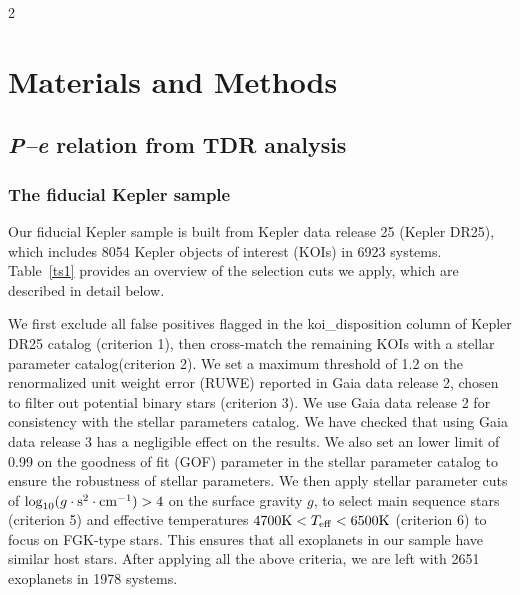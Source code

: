 \documentclass[10pt]{article}
\begin{document}
\begin{multicols}{2}
\section*{Materials and Methods}
\subsection*{\hypertarget{s1}{\emph{P--e} relation from TDR analysis}}
\subsubsection*{\hypertarget{s1.1}{The fiducial Kepler sample}}
\noindent Our fiducial Kepler sample is built from Kepler data release 25 (Kepler DR25)\cite{2018ApJS..235...38T,KDR25}, which includes 8054 Kepler objects of interest (KOIs) in 6923 systems.
Table~\ref{ts1} provides an overview of the selection cuts we apply, which are described in detail below.

We first exclude all false positives flagged in the koi\_disposition column of Kepler DR25 catalog (criterion 1), then cross-match the remaining KOIs with a stellar parameter catalog\cite{2020AJ....159..280B}(criterion 2).
We set a maximum threshold of 1.2 on the renormalized unit weight error (RUWE) reported in Gaia data release 2\cite{2016A&A...595A...1G,2018A&A...616A...1G}, chosen to filter out potential binary stars (criterion 3).
We use Gaia data release 2 for consistency with the stellar parameters catalog\cite{2020AJ....159..280B}.
We have checked that using Gaia data release 3\cite{2023A&A...674A...1G} has a negligible effect on the results.
We also set an lower limit of 0.99 on the goodness of fit (GOF) parameter in the stellar parameter catalog to ensure the robustness of stellar parameters.
We then apply stellar parameter cuts of $\log_{10}(g\cdot{\rm s}^2\cdot{\rm cm}^{-1})>4$ on the surface gravity $g$, to select main sequence stars (criterion 5) and effective temperatures $4700{\rm K} < T_{\rm eff} < 6500{\rm K}$ (criterion 6) to focus on FGK-type stars.
This ensures that all exoplanets in our sample have similar host stars\cite{2017AJ....154..109F,2018ApJ...866...99B}.
After applying all the above criteria, we are left with 2651 exoplanets in 1978 systems.
\end{multicols}
\end{document}

